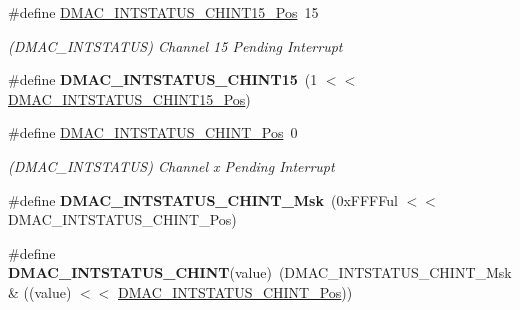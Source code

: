 \begin{DoxyCompactItemize}
\item 
\hypertarget{group___s_a_m_l21___d_m_a_c_ga2b16a69ed2e73df11f8dd234fa9d9861}{}\#define \hyperlink{group___s_a_m_l21___d_m_a_c_ga2b16a69ed2e73df11f8dd234fa9d9861}{D\+M\+A\+C\+\_\+\+I\+N\+T\+S\+T\+A\+T\+U\+S\+\_\+\+C\+H\+I\+N\+T15\+\_\+\+Pos}~15\label{group___s_a_m_l21___d_m_a_c_ga2b16a69ed2e73df11f8dd234fa9d9861}

\begin{DoxyCompactList}\small\item\em (D\+M\+A\+C\+\_\+\+I\+N\+T\+S\+T\+A\+T\+U\+S) Channel 15 Pending Interrupt \end{DoxyCompactList}\item 
\hypertarget{group___s_a_m_l21___d_m_a_c_gace46bab02e903087b69ef6a5b3645f70}{}\#define {\bfseries D\+M\+A\+C\+\_\+\+I\+N\+T\+S\+T\+A\+T\+U\+S\+\_\+\+C\+H\+I\+N\+T15}~(1 $<$$<$ \hyperlink{group___s_a_m_l21___d_m_a_c_ga2b16a69ed2e73df11f8dd234fa9d9861}{D\+M\+A\+C\+\_\+\+I\+N\+T\+S\+T\+A\+T\+U\+S\+\_\+\+C\+H\+I\+N\+T15\+\_\+\+Pos})\label{group___s_a_m_l21___d_m_a_c_gace46bab02e903087b69ef6a5b3645f70}

\item 
\hypertarget{group___s_a_m_l21___d_m_a_c_ga4678c849bd83e0f1ce8ec41f24617753}{}\#define \hyperlink{group___s_a_m_l21___d_m_a_c_ga4678c849bd83e0f1ce8ec41f24617753}{D\+M\+A\+C\+\_\+\+I\+N\+T\+S\+T\+A\+T\+U\+S\+\_\+\+C\+H\+I\+N\+T\+\_\+\+Pos}~0\label{group___s_a_m_l21___d_m_a_c_ga4678c849bd83e0f1ce8ec41f24617753}

\begin{DoxyCompactList}\small\item\em (D\+M\+A\+C\+\_\+\+I\+N\+T\+S\+T\+A\+T\+U\+S) Channel x Pending Interrupt \end{DoxyCompactList}\item 
\hypertarget{group___s_a_m_l21___d_m_a_c_gaa1493da643c2922ff50c0e11e3aadb4d}{}\#define {\bfseries D\+M\+A\+C\+\_\+\+I\+N\+T\+S\+T\+A\+T\+U\+S\+\_\+\+C\+H\+I\+N\+T\+\_\+\+Msk}~(0x\+F\+F\+F\+Ful $<$$<$ D\+M\+A\+C\+\_\+\+I\+N\+T\+S\+T\+A\+T\+U\+S\+\_\+\+C\+H\+I\+N\+T\+\_\+\+Pos)\label{group___s_a_m_l21___d_m_a_c_gaa1493da643c2922ff50c0e11e3aadb4d}

\item 
\hypertarget{group___s_a_m_l21___d_m_a_c_gaf1c25522936f7266316d7a4b45dcf5b1}{}\#define {\bfseries D\+M\+A\+C\+\_\+\+I\+N\+T\+S\+T\+A\+T\+U\+S\+\_\+\+C\+H\+I\+N\+T}(value)~(D\+M\+A\+C\+\_\+\+I\+N\+T\+S\+T\+A\+T\+U\+S\+\_\+\+C\+H\+I\+N\+T\+\_\+\+Msk \& ((value) $<$$<$ \hyperlink{group___s_a_m_l21___d_m_a_c_ga4678c849bd83e0f1ce8ec41f24617753}{D\+M\+A\+C\+\_\+\+I\+N\+T\+S\+T\+A\+T\+U\+S\+\_\+\+C\+H\+I\+N\+T\+\_\+\+Pos}))\label{group___s_a_m_l21___d_m_a_c_gaf1c25522936f7266316d7a4b45dcf5b1}


\end{DoxyCompactItemize}

